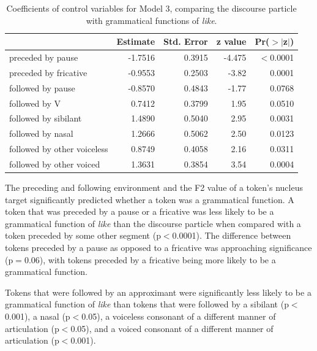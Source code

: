 \begin{table}[ht]
\begin{center}
\begin{tabular}{lrrrr}
  \hline
 & Estimate & Std. Error & z value & Pr($>$$|$z$|$) \\
  \hline

preceded by pause  & -1.7516  & 0.3915 & -4.475 & $<$0.0001 \\
preceded by fricative 	& -0.9553   &  0.2503 & -3.82 & 0.0001 \\
followed by pause     &  -0.8570   &  0.4843  & -1.77 & 0.0768 \\
followed by V    &  0.7412 &    0.3799 &  1.95 & 0.0510 \\
followed by sibilant   & 1.4890  &   0.5040   & 2.95   & 0.0031 \\
followed by nasal    & 1.2666  &   0.5062   & 2.50 & 0.0123 \\
followed by other voiceless & 0.8749   &  0.4058 &  2.16 & 0.0311 \\
followed by other voiced  & 1.3631     & 0.3854   & 3.54 & 0.0004 \\  

   \hline
\end{tabular}
\caption{Coefficients of control variables for Model 3, comparing the discourse particle with grammatical functions of \textit{like}.}
\label{dpgramcoeff-control}
\end{center}
\end{table}


\noindent The preceding and following environment and the F2 value of a token's nucleus target significantly predicted whether a token was a grammatical function.  A token that was preceded by a pause or a fricative was less likely to be a grammatical function of \textit{like} than the discourse particle when compared with a token preceded by some other segment (p$<$0.0001).  The difference between tokens preceded by a pause as opposed to a fricative was approaching significance (p$=$0.06), with tokens preceded by a fricative being more likely to be a grammatical function.  

Tokens that were followed by an approximant were significantly less likely to be a grammatical function of \textit{like} than tokens that were followed by a sibilant (p$<$0.001), a nasal (p$<$0.05), a voiceless consonant of a different manner of articulation (p$<$0.05), and a voiced consonant of a different manner of articulation (p$<$0.001).  

